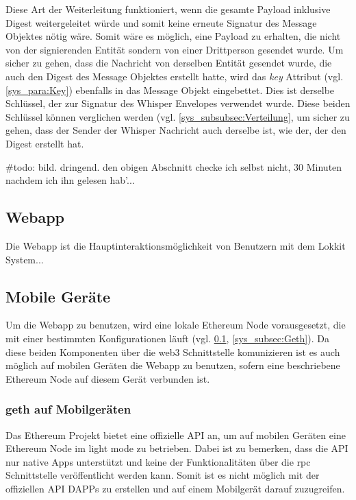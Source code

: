 Diese Art der Weiterleitung funktioniert, wenn die gesamte Payload inklusive Digest weitergeleitet würde und somit keine erneute Signatur des Message Objektes nötig wäre. Somit wäre es möglich, eine Payload zu erhalten, die nicht von der signierenden Entität sondern von einer Drittperson gesendet wurde. Um sicher zu gehen, dass die Nachricht von derselben Entität gesendet wurde, die auch den Digest des Message Objektes erstellt hatte, wird das \emph{key} Attribut (vgl. \ref{sys_para:Key}) ebenfalls in das Message Objekt eingebettet. Dies ist derselbe Schlüssel, der zur Signatur des Whisper Envelopes verwendet wurde. Diese beiden Schlüssel können verglichen werden (vgl. \ref{sys_subsubsec:Verteilung}, um sicher zu gehen, dass der Sender der Whisper Nachricht auch derselbe ist, wie der, der den Digest erstellt hat.

\#todo: bild. dringend. den obigen Abschnitt checke ich selbst nicht, 30 Minuten nachdem ich ihn gelesen hab'...

\subsection{Webapp}
\label{subsec:Webapp}
Die Webapp ist die Hauptinteraktionsmöglichkeit von Benutzern mit dem Lokkit System...

\subsection{Mobile Geräte}
Um die Webapp zu benutzen, wird eine lokale Ethereum Node vorausgesetzt, die mit einer bestimmten Konfigurationen läuft (vgl. \ref{subsec:Webapp}, \ref{sys_subsec:Geth}). Da diese beiden Komponenten über die web3 Schnittstelle komunizieren ist es auch möglich auf mobilen Geräten die Webapp zu benutzen, sofern eine beschriebene Ethereum Node auf diesem Gerät verbunden ist.

\subsubsection{geth auf Mobilgeräten}
Das Ethereum Projekt bietet eine offizielle API an, um auf mobilen Geräten eine Ethereum Node im light mode zu betrieben. Dabei ist zu bemerken, dass die API nur native Apps unterstützt und keine der Funktionalitäten über die rpc Schnittstelle veröffentlicht werden kann. Somit ist es nicht möglich mit der offiziellen API \acrshort{DAPPs} zu erstellen und auf einem Mobilgerät darauf zuzugreifen.\cite[wiki/Mobile: Introduction]{go-ethereum}

